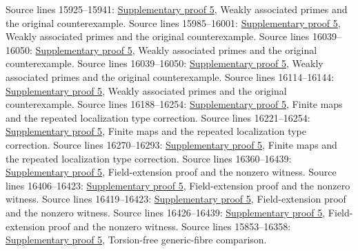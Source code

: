 \begin{AlgebraSourceRoutes}
 Source lines 15925--15941: \hyperlink{algebra_symbolic_weakass_notes_20260927}{Supplementary proof 5}, Weakly associated primes and the original counterexample.
 Source lines 15985--16001: \hyperlink{algebra_symbolic_weakass_notes_20260927}{Supplementary proof 5}, Weakly associated primes and the original counterexample.
 Source lines 16039--16050: \hyperlink{algebra_symbolic_weakass_notes_20260927}{Supplementary proof 5}, Weakly associated primes and the original counterexample.
 Source lines 16039--16050: \hyperlink{algebra_symbolic_weakass_notes_20260927}{Supplementary proof 5}, Weakly associated primes and the original counterexample.
 Source lines 16114--16144: \hyperlink{algebra_symbolic_weakass_notes_20260927}{Supplementary proof 5}, Weakly associated primes and the original counterexample.
 Source lines 16188--16254: \hyperlink{algebra_symbolic_weakass_notes_20260927}{Supplementary proof 5}, Finite maps and the repeated localization type correction.
 Source lines 16221--16254: \hyperlink{algebra_symbolic_weakass_notes_20260927}{Supplementary proof 5}, Finite maps and the repeated localization type correction.
 Source lines 16270--16293: \hyperlink{algebra_symbolic_weakass_notes_20260927}{Supplementary proof 5}, Finite maps and the repeated localization type correction.
 Source lines 16360--16439: \hyperlink{algebra_symbolic_weakass_notes_20260927}{Supplementary proof 5}, Field-extension proof and the nonzero witness.
 Source lines 16406--16423: \hyperlink{algebra_symbolic_weakass_notes_20260927}{Supplementary proof 5}, Field-extension proof and the nonzero witness.
 Source lines 16419--16423: \hyperlink{algebra_symbolic_weakass_notes_20260927}{Supplementary proof 5}, Field-extension proof and the nonzero witness.
 Source lines 16426--16439: \hyperlink{algebra_symbolic_weakass_notes_20260927}{Supplementary proof 5}, Field-extension proof and the nonzero witness.
 Source lines 15853--16358: \hyperlink{algebra_symbolic_weakass_notes_20260927}{Supplementary proof 5}, Torsion-free generic-fibre comparison.
\end{AlgebraSourceRoutes}

